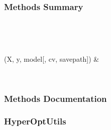 \documentclass[letterpaper,10pt,english]{sphinxmanual}
\begin{document}
\begin{fulllineitems}
\subsubsection*{Methods Summary}


\begin{savenotes}\sphinxatlongtablestart\begin{longtable}[c]{}
\hline

\endfirsthead

%
{}\\
\hline

\endhead

\hline
{}\\
\endfoot

\endlastfoot

{\hyperref[\detokenize{api/mastml.hyper_opt.GridSearch:mastml.hyper_opt.GridSearch.fit}]{}}(X, y, model{[}, cv, savepath{]})
&

\\
\hline
\end{longtable}\sphinxatlongtableend\end{savenotes}
\subsubsection*{Methods Documentation}

\begin{fulllineitems}
\label{\detokenize{api/mastml.hyper_opt.GridSearch:mastml.hyper_opt.GridSearch.fit}}
\end{fulllineitems}


\end{fulllineitems}



\subsubsection{HyperOptUtils}
\label{\detokenize{api/mastml.hyper_opt.HyperOptUtils:hyperoptutils}}\label{\detokenize{api/mastml.hyper_opt.HyperOptUtils::doc}}
\end{document}
